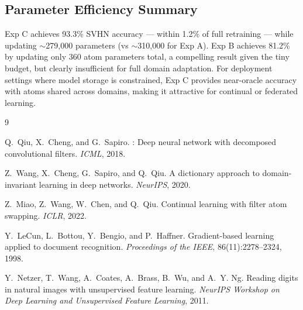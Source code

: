 \documentclass[11pt,letterpaper]{article}
\begin{document}
\subsection{Parameter Efficiency Summary}

Exp C achieves 93.3\% SVHN accuracy — within 1.2\% of full retraining —
while updating $\sim$279{,}000 parameters (vs $\sim$310{,}000 for Exp A).
Exp B achieves 81.2\% by updating only 360 atom parameters total, a
compelling result given the tiny budget, but clearly insufficient for
full domain adaptation.  For deployment settings where model storage is
constrained, Exp C provides near-oracle accuracy with atoms shared across
domains, making it attractive for continual or federated learning.

\begin{thebibliography}{9}

Q.~Qiu, X.~Cheng, and G.~Sapiro.
: Deep neural network with decomposed convolutional filters.
\newblock \emph{ICML}, 2018.

Z.~Wang, X.~Cheng, G.~Sapiro, and Q.~Qiu.
\newblock A dictionary approach to domain-invariant learning in deep networks.
\newblock \emph{NeurIPS}, 2020.

Z.~Miao, Z.~Wang, W.~Chen, and Q.~Qiu.
\newblock Continual learning with filter atom swapping.
\newblock \emph{ICLR}, 2022.

Y.~LeCun, L.~Bottou, Y.~Bengio, and P.~Haffner.
\newblock Gradient-based learning applied to document recognition.
\newblock \emph{Proceedings of the IEEE}, 86(11):2278--2324, 1998.

Y.~Netzer, T.~Wang, A.~Coates, A.~Brass, B.~Wu, and A.~Y. Ng.
\newblock Reading digits in natural images with unsupervised feature learning.
\newblock \emph{NeurIPS Workshop on Deep Learning and Unsupervised Feature
  Learning}, 2011.

\end{thebibliography}
\end{document}
